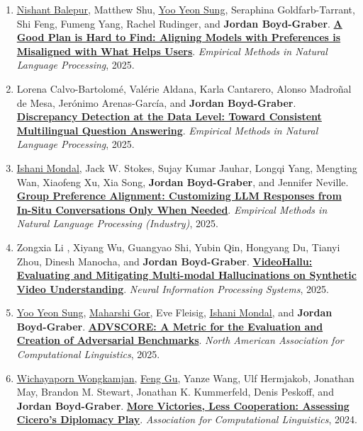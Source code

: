 {\begin{enumerate}
	 \item \underline{\href{https://nbalepur.github.io/}{Nishant Balepur}}, Matthew Shu, \underline{\href{http://yysung.github.io/}{Yoo Yeon Sung}}, Seraphina Goldfarb-Tarrant, Shi Feng, Fumeng Yang, Rachel Rudinger, and {\bf Jordan Boyd-Graber}.  {\bf \href{http://cs.umd.edu/~jbg//docs/2025_emnlp_planorama.pdf}{A Good Plan is Hard to Find: Aligning Models with Preferences is Misaligned with What Helps Users}}.  \emph{Empirical Methods in Natural Language Processing}, 2025.

	 \item Lorena Calvo-Bartolom\'{e}, Val\'{e}rie Aldana, Karla Cantarero, Alonso Madro\~nal de Mesa, Jer\'{o}nimo Arenas-Garc\'{i}a, and {\bf Jordan Boyd-Graber}.  {\bf \href{http://cs.umd.edu/~jbg//docs/2025_emnlp_mind.pdf}{Discrepancy Detection at the Data Level: Toward Consistent Multilingual Question Answering}}.  \emph{Empirical Methods in Natural Language Processing}, 2025.

	 \item \underline{\href{https://ishani-mondal.github.io/}{Ishani Mondal}}, Jack W. Stokes, Sujay Kumar Jauhar, Longqi Yang, Mengting Wan, Xiaofeng Xu, Xia Song, {\bf Jordan Boyd-Graber}, and Jennifer Neville.  {\bf \href{http://cs.umd.edu/~jbg//docs/2025_emnlp_grouppreference.pdf}{Group Preference Alignment: Customizing LLM Responses from In-Situ Conversations Only When Needed}}.  \emph{Empirical Methods in Natural Language Processing (Industry)}, 2025.

	 \item Zongxia Li , Xiyang Wu, Guangyao Shi, Yubin Qin, Hongyang Du, Tianyi Zhou, Dinesh Manocha, and {\bf Jordan Boyd-Graber}.  {\bf \href{http://cs.umd.edu/~jbg//docs/2025_neurips_videohallusion.pdf}{VideoHallu: Evaluating and Mitigating Multi-modal Hallucinations on Synthetic Video Understanding}}.  \emph{Neural Information Processing Systems}, 2025.

	 \item \underline{\href{http://yysung.github.io/}{Yoo Yeon Sung}}, \underline{\href{https://mgor.info/}{Maharshi Gor}}, Eve Fleisig, \underline{\href{https://ishani-mondal.github.io/}{Ishani Mondal}}, and {\bf Jordan Boyd-Graber}.  {\bf \href{http://cs.umd.edu/~jbg//docs/2025_naacl_advscore.pdf}{ADVSCORE: A Metric for the Evaluation and Creation of Adversarial Benchmarks}}.  \emph{North American Association for Computational Linguistics}, 2025.

	 \item \underline{\href{https://wwongkamjan.github.io}{Wichayaporn Wongkamjan}}, \underline{Feng Gu}, Yanze Wang, Ulf Hermjakob, Jonathan May, Brandon M. Stewart, Jonathan K. Kummerfeld, Denis Peskoff, and {\bf Jordan Boyd-Graber}.  {\bf \href{http://cs.umd.edu/~jbg//docs/2024_acl_cicero.pdf}{More Victories, Less Cooperation: Assessing Cicero's Diplomacy Play}}.  \emph{Association for Computational Linguistics}, 2024.


\end{enumerate}}
